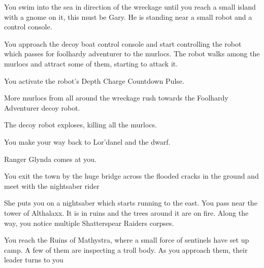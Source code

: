
You swim into the sea in direction of the wreckage until you reach a small island with a gnome on it, this must be Gary. He is standing near a small robot and a control console.


You approach the decoy boat control console and start controlling the robot which passes for foolhardy adventurer to the murlocs. The robot walks among the murlocs and attract some of them, starting to attack it.

You activate the robot's Depth Charge Countdown Pulse.


More murlocs from all around the wreckage rush towards the Foolhardy Adventurer decoy robot.


The decoy robot exploses, killing all the murlocs.

You make your way back to Lor'danel and the dwarf.



Ranger Glynda comes at you.



You exit the town by the huge bridge across the flooded cracks in the ground and meet with the nightsaber rider



She puts you on a nightsaber which starts running to the east. You pass near the tower of Althalaxx. It is in ruins and the trees around it are on fire. Along the way, you notice multiple Shatterspear Raiders corpses.

You reach the Ruins of Mathystra, where a small force of sentinels have set up camp. A few of them are inspecting a troll body. As you approach them, their leader turns to you

